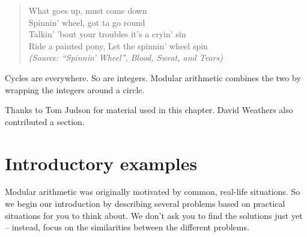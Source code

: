 
\begin{quote}
What goes up, must come down\\
Spinnin' wheel, got ta go round\\
Talkin' 'bout your troubles it's a cryin' sin\\
Ride a painted pony, Let the spinnin' wheel spin\\
\emph{(Source:  ``Spinnin' Wheel'', Blood, Sweat, and Tears)}
\end{quote}

\bigskip

Cycles are everywhere. So are integers. Modular arithmetic combines the two by wrapping the integers around a circle.
\medskip

Thanks to Tom Judson for material used in this chapter.  David Weathers also contributed a section.

\section{Introductory examples\quad
{}}\label{sec:Mod.1}
Modular arithmetic was originally motivated by common, real-life situations. So we begin our introduction by describing several problems  based on practical situations for you to think about. We don't ask you to find the solutions just yet -- instead, focus on the similarities between the different problems. 

